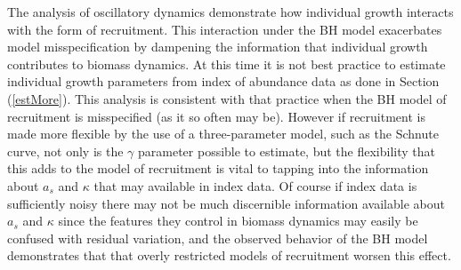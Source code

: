 
%
The analysis of oscillatory dynamics demonstrate how individual growth 
interacts with the form of recruitment. 
This interaction under the BH model exacerbates model misspecification by 
dampening the information that individual growth contributes to biomass dynamics.%
At this time it is not best practice to estimate individual growth parameters 
from index of abundance data as done in Section (\ref{estMore}). This analysis 
is consistent with that practice when the BH model of recruitment is misspecified (as it so often may be). 
However if recruitment is made more flexible by the use of a three-parameter model, 
such as the Schnute curve, not only is the $\gamma$ parameter possible to estimate, but the
flexibility that this adds to the model of recruitment is vital to tapping into 
the information about $a_s$ and $\kappa$ that may available in index data. Of course if 
index data is sufficiently noisy there may not be much discernible information available 
about $a_s$ and $\kappa$ since the features they control in biomass dynamics may 
easily be confused with residual variation, and the observed behavior of the BH model 
demonstrates that that overly restricted models of recruitment worsen this effect.  

